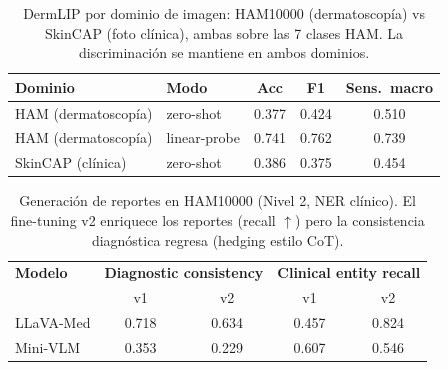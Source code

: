 \begin{table}[htbp]
  \centering
  \caption{DermLIP por dominio de imagen: HAM10000 (dermatoscopía) vs SkinCAP (foto clínica),
  ambas sobre las 7 clases HAM. La discriminación se mantiene en ambos dominios.}
  \label{tab:dermlip_dominio}
  \begin{tabular}{llccc}
    \toprule
    \textbf{Dominio} & \textbf{Modo} & \textbf{Acc} & \textbf{F1} & \textbf{Sens.\ macro} \\
    \midrule
    HAM (dermatoscopía) & zero-shot      & 0.377 & 0.424 & 0.510 \\
    HAM (dermatoscopía) & linear-probe   & 0.741 & 0.762 & 0.739 \\
    SkinCAP (clínica)   & zero-shot      & 0.386 & 0.375 & 0.454 \\
    \bottomrule
  \end{tabular}
\end{table}

\begin{table}[htbp]
  \centering
  \caption{Generación de reportes en HAM10000 (Nivel 2, NER clínico). El fine-tuning v2 enriquece los
  reportes (recall $\uparrow$) pero la consistencia diagnóstica regresa (hedging estilo CoT).}
  \label{tab:generacion_v1v2}
  \begin{tabular}{lcccc}
    \toprule
    \textbf{Modelo} & \multicolumn{2}{c}{\textbf{Diagnostic consistency}} & \multicolumn{2}{c}{\textbf{Clinical entity recall}} \\
    & v1 & v2 & v1 & v2 \\
    \midrule
    LLaVA-Med & 0.718 & 0.634 & 0.457 & 0.824 \\
    Mini-VLM  & 0.353 & 0.229 & 0.607 & 0.546 \\
    \bottomrule
  \end{tabular}
\end{table}

